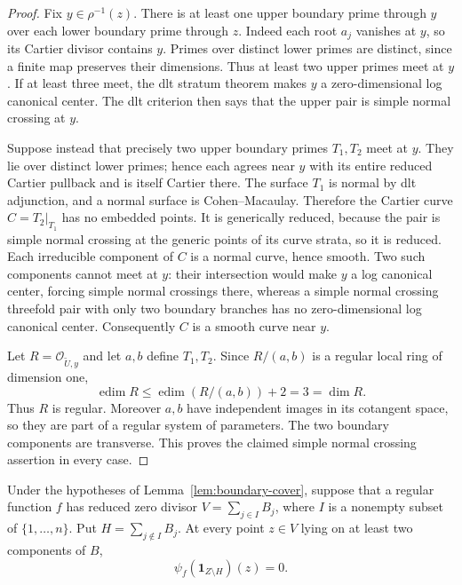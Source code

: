 \begin{proof}
Fix $y\in\rho^{-1}(z)$.  There is at least one upper boundary prime
through $y$ over each lower boundary prime through $z$.  Indeed each
root $a_j$ vanishes at $y$, so its Cartier divisor contains $y$.
Primes over distinct lower primes are distinct, since a finite map
preserves their dimensions.  Thus at least two upper primes meet at
$y$.  If at least three meet, the dlt stratum theorem makes $y$ a
zero-dimensional log canonical center.  The dlt criterion then says
that the upper pair is simple normal crossing at $y$.

Suppose instead that precisely two upper boundary primes $T_1,T_2$
meet at $y$.  They lie over distinct lower primes; hence each agrees
near $y$ with its entire reduced Cartier pullback and is itself
Cartier there.  The surface $T_1$ is normal by dlt adjunction, and a
normal surface is Cohen--Macaulay.  Therefore the Cartier curve
$C=T_2|_{T_1}$ has no embedded points.  It is generically reduced,
because the pair is simple normal crossing at the generic points of
its curve strata, so it is reduced.  Each irreducible component of
$C$ is a normal curve, hence smooth.  Two such components cannot meet
at $y$: their intersection would make $y$ a log canonical center,
forcing simple normal crossings there, whereas a simple normal
crossing threefold pair with only two boundary branches has no
zero-dimensional log canonical center.  Consequently $C$ is a smooth
curve near $y$.

Let $R=\mathcal O_{\widetilde U,y}$ and let $a,b$ define $T_1,T_2$.
Since $R/(a,b)$ is a regular local ring of dimension one,
\[
 \operatorname{edim}R
 \le \operatorname{edim}(R/(a,b))+2=3=\dim R.
\]
Thus $R$ is regular.  Moreover $a,b$ have independent images in its
cotangent space, so they are part of a regular system of parameters.
The two boundary components are transverse.  This proves the claimed
simple normal crossing assertion in every case.
\end{proof}

\begin{lemma}
\label{lem:boundary-nearby-zero}
Under the hypotheses of Lemma~\ref{lem:boundary-cover}, suppose that a
regular function $f$ has reduced zero divisor
$V=\sum_{j\in I}B_j$, where $I$ is a nonempty subset of
$\{1,\ldots,n\}$.  Put $H=\sum_{j\notin I}B_j$.
At every point $z\in V$ lying on at least two components of $B$,
\[
 \psi_f(\mathbf1_{Z\setminus H})(z)=0.
\]
\end{lemma}

